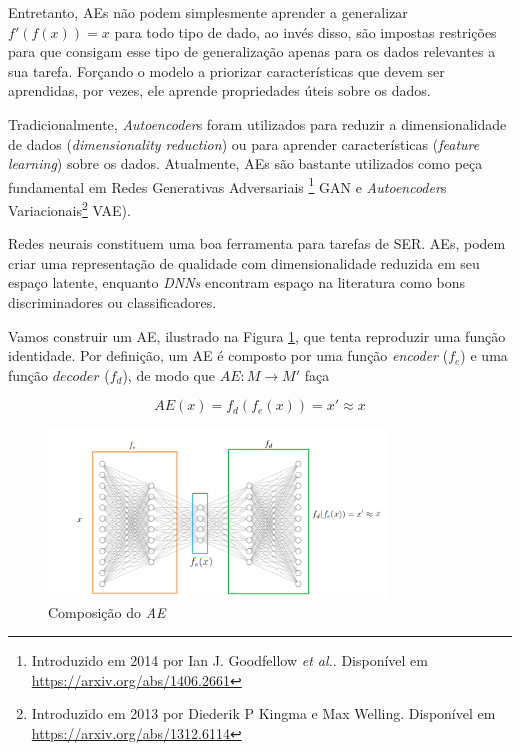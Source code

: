 Entretanto, \acrshort{AE}s não podem simplesmente aprender a generalizar $f'(f(x)) = x$ para todo tipo de dado, ao invés disso, são impostas restrições para que consigam esse tipo de generalização apenas para os dados relevantes a sua tarefa. Forçando o modelo a priorizar características que devem ser aprendidas, por vezes, ele aprende propriedades úteis sobre os dados.

Tradicionalmente, \textit{Autoencoder}s foram utilizados para reduzir a dimensionalidade de dados (\textit{dimensionality reduction}) ou para aprender características (\textit{feature learning}) sobre os dados. Atualmente, \acrshort{AE}s são bastante utilizados como peça fundamental em Redes Generativas Adversariais \footnote{Introduzido em 2014 por Ian J. Goodfellow \textit{et al.}. Disponível em \url{https://arxiv.org/abs/1406.2661}} \acrlong{GAN} e \textit{Autoencoder}s Variacionais\footnote{Introduzido em 2013 por Diederik P Kingma e Max Welling. Disponível em \url{https://arxiv.org/abs/1312.6114}} \acrlong{VAE}).



Redes neurais constituem uma boa ferramenta para tarefas de \acrshort{SER}. \acrlong{AE}s, podem criar uma representação de qualidade com dimensionalidade reduzida em seu espaço latente, enquanto \textit{DNNs} encontram espaço na literatura como bons discriminadores ou classificadores.

Vamos construir um \acrshort{AE}, ilustrado na Figura \ref{fig:composicaoae}, que tenta reproduzir uma função identidade. Por definição, um \acrlong{AE} é composto por uma função \textit{encoder} ($f_e$) e uma função $decoder$ ($f_d$), de modo que $AE: M \rightarrow M'$ faça

\begin{equation}
    AE(x) = f_d(f_e(x)) = x' \approx x
\end{equation}

\begin{figure}[]
    \centering
    \includegraphics[width=0.8\textwidth]{img/p-autoencoder.png}
    \caption{\label{fig:composicaoae}Composição do \textit{AE}}
\end{figure}

